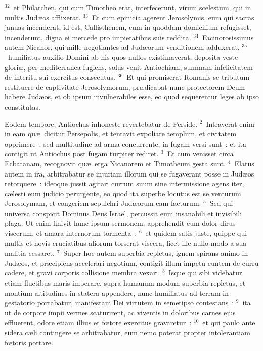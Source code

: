 ${}^{32}$~et Philarchen, qui cum Timotheo erat, interfecerunt, virum scelestum, qui in multis Jud\ae os afflixerat.
${}^{33}$~Et cum epinicia agerent Jerosolymis, eum qui sacras januas incenderat, id est, Callisthenem, cum in quoddam domicilium refugisset, incenderunt, digna ei mercede pro impietatibus suis reddita.
${}^{34}$~Facinorosissimus autem Nicanor, qui mille negotiantes ad Jud\ae orum venditionem adduxerat,
${}^{35}$~humiliatus auxilio Domini ab his quos nullos existimaverat, deposita veste glori\ae , per mediterranea fugiens, solus venit Antiochiam, summam infelicitatem de interitu sui exercitus consecutus.
${}^{36}$~Et qui promiserat Romanis se tributum restituere de captivitate Jerosolymorum, pr\ae dicabat nunc protectorem Deum habere Jud\ae os, et ob ipsum invulnerabiles esse, eo quod sequerentur leges ab ipso constitutas.

\lettrine[lines=3,image=true,loversize=0.05,lraise=-0.03]{E}{}odem tempore, Antiochus inhoneste revertebatur de Perside.
${}^{2}$~Intraverat enim in eam qu\ae\ dicitur Persepolis, et tentavit expoliare templum, et civitatem opprimere~: sed multitudine ad arma concurrente, in fugam versi sunt~: et ita contigit ut Antiochus post fugam turpiter rediret.
${}^{3}$~Et cum venisset circa Ecbatanam, recognovit qu\ae\ erga Nicanorem et Timotheum gesta sunt.
${}^{4}$~Elatus autem in ira, arbitrabatur se injuriam illorum qui se fugaverant posse in Jud\ae os retorquere~: ideoque jussit agitari currum suum sine intermissione agens iter, c\ae lesti eum judicio perurgente, eo quod ita superbe locutus est se venturum Jerosolymam, et congeriem sepulchri Jud\ae orum eam facturum.
${}^{5}$~Sed qui universa conspicit Dominus Deus Isra\"el, percussit eum insanabili et invisibili plaga. Ut enim finivit hunc ipsum sermonem, apprehendit eum dolor dirus viscerum, et amara internorum tormenta~:
${}^{6}$~et quidem satis juste, quippe qui multis et novis cruciatibus aliorum torserat viscera, licet ille nullo modo a sua malitia cessaret.
${}^{7}$~Super hoc autem superbia repletus, ignem spirans animo in Jud\ae os, et pr\ae cipiens accelerari negotium, contigit illum impetu euntem de curru cadere, et gravi corporis collisione membra vexari.
${}^{8}$~Isque qui sibi videbatur etiam fluctibus maris imperare, supra humanum modum superbia repletus, et montium altitudines in statera appendere, nunc humiliatus ad terram in gestatorio portabatur, manifestam Dei virtutem in semetipso contestans~:
${}^{9}$~ita ut de corpore impii vermes scaturirent, ac viventis in doloribus carnes ejus effluerent, odore etiam illius et fœtore exercitus gravaretur~:
${}^{10}$~et qui paulo ante sidera c\ae li contingere se arbitrabatur, eum nemo poterat propter intolerantiam fœtoris portare.


